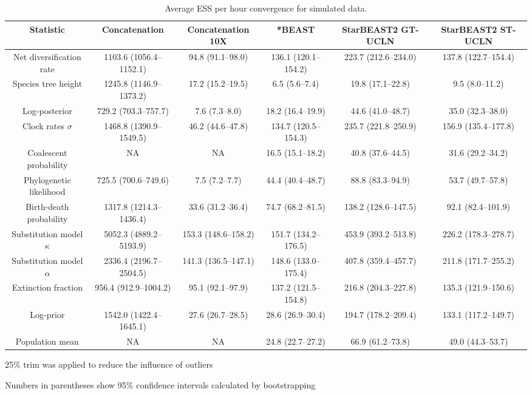 \documentclass[12pt]{article}
\begin{document}
\begin{landscape}
\clearpage

\begin{table}[htb!]
\centering
\caption{Average ESS per hour convergence for simulated data.}
\label{tab:simulatedPerHour}
\begin{threeparttable}
\begin{adjustbox}{center}
\renewcommand{\arraystretch}{1.2}
\footnotesize
\begin{tabular}{|c|c|c|c|c|c|}
\multicolumn{1}{c}{Statistic} & \multicolumn{1}{c}{Concatenation} & \multicolumn{1}{c}{Concatenation 10X} & \multicolumn{1}{c}{*BEAST} & \multicolumn{1}{c}{StarBEAST2 GT-UCLN} & \multicolumn{1}{c}{StarBEAST2 ST-UCLN}\tabularnewline
\hline
Net diversification rate & 1103.6 (1056.4--1152.1) & 94.8 (91.1--98.0) & 136.1 (120.1--154.2) & 223.7 (212.6--234.0) & 137.8 (122.7--154.4)\tabularnewline
\hline
Species tree height & 1245.8 (1146.9--1373.2) & 17.2 (15.2--19.5) & 6.5 (5.6--7.4) & 19.8 (17.1--22.8) & 9.5 (8.0--11.2)\tabularnewline
\hline
Log-posterior & 729.2 (703.3--757.7) & 7.6 (7.3--8.0) & 18.2 (16.4--19.9) & 44.6 (41.0--48.7) & 35.0 (32.3--38.0)\tabularnewline
\hline
Clock rates $\sigma$ & 1468.8 (1390.9--1549.5) & 46.2 (44.6--47.8) & 134.7 (120.5--154.3) & 235.7 (221.8--250.9) & 156.9 (135.4--177.8)\tabularnewline
\hline
Coalescent probability & NA & NA & 16.5 (15.1--18.2) & 40.8 (37.6--44.5) & 31.6 (29.2--34.2)\tabularnewline
\hline
Phylogenetic likelihood & 725.5 (700.6--749.6) & 7.5 (7.2--7.7) & 44.4 (40.4--48.7) & 88.8 (83.3--94.9) & 53.7 (49.7--57.8)\tabularnewline
\hline
Birth-death probability & 1317.8 (1214.3--1436.4) & 33.6 (31.2--36.4) & 74.7 (68.2--81.5) & 138.2 (128.6--147.5) & 92.1 (82.4--101.9)\tabularnewline
\hline
Substitution model $\kappa$ & 5052.3 (4889.2--5193.9) & 153.3 (148.6--158.2) & 151.7 (134.2--176.5) & 453.9 (393.2--513.8) & 226.2 (178.3--278.7)\tabularnewline
\hline
Substitution model $\alpha$ & 2336.4 (2196.7--2504.5) & 141.3 (136.5--147.1) & 148.6 (133.0--175.4) & 407.8 (359.4--457.7) & 211.8 (171.7--255.2)\tabularnewline
\hline
Extinction fraction & 956.4 (912.9--1004.2) & 95.1 (92.1--97.9) & 137.2 (121.5--154.8) & 216.8 (204.3--227.8) & 135.3 (121.9--150.6)\tabularnewline
\hline
Log-prior & 1542.0 (1422.4--1645.1) & 27.6 (26.7--28.5) & 28.6 (26.9--30.4) & 194.7 (178.2--209.4) & 133.1 (117.2--149.7)\tabularnewline
\hline
Population mean & NA & NA & 24.8 (22.7--27.2) & 66.9 (61.2--73.8) & 49.0 (44.3--53.7)\tabularnewline
\hline
\end{tabular}
\end{adjustbox}
\begin{tablenotes}
\footnotesize
\item 25\% trim was applied to reduce the influence of outliers
\item Numbers in parentheses show 95\% confidence intervals calculated by bootstrapping
\end{tablenotes}
\end{threeparttable}
\end{table}


\end{landscape}
\end{document}
